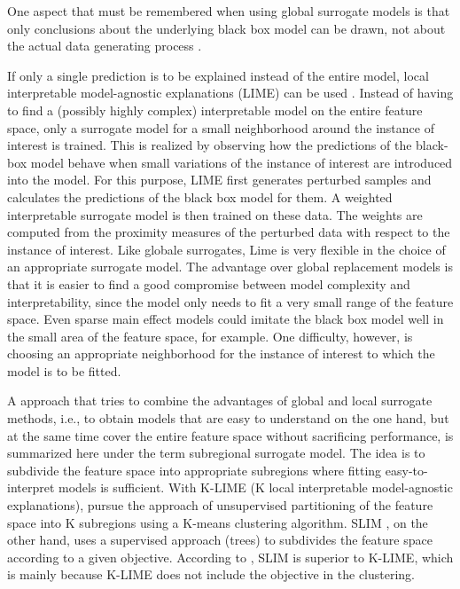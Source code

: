 One aspect that must be remembered when using global surrogate models is that only conclusions about the underlying black box model can be drawn, not about the actual data generating process \citep{Molnar.2019}.


If only a single prediction is to be explained instead of the entire model, local interpretable model-agnostic explanations (LIME) can be used \citep{Ribeiro.2016}. Instead of having to find a (possibly highly complex) interpretable model on the entire feature space, only a surrogate model for a small neighborhood around the instance of interest is trained. This is realized by observing how the predictions of the black-box model behave when small variations of the instance of interest are introduced into the model. For this purpose, LIME first generates perturbed samples and calculates the predictions of the black box model for them. A weighted interpretable surrogate model is then trained on these data. The weights are computed from the proximity measures of the perturbed data with respect to the instance of interest. 
Like globale surrogates, Lime is very flexible in the choice of an appropriate surrogate model. The advantage over global replacement models is that it is easier to find a good compromise between model complexity and interpretability, since the model only needs to fit a very small range of the feature space. Even sparse main effect models could imitate the black box model well in the small area of the feature space, for example. One difficulty, however, is choosing an appropriate neighborhood for the instance of interest to which the model is to be fitted.
\citep{Molnar.2019}


A approach that tries to combine the advantages of global and local surrogate methods, i.e., to obtain models that are easy to understand on the one hand, but at the same time cover the entire feature space without sacrificing performance, is summarized here under the term subregional surrogate model.
The idea is to subdivide the feature space into appropriate subregions where fitting easy-to-interpret models is sufficient.
With K-LIME (K local interpretable model-agnostic explanations), \citet{Hall.2017}  pursue the approach of unsupervised partitioning of the feature space into K subregions using a K-means clustering algorithm. 
SLIM \citep{Hu.2020}, on the other hand, uses a supervised approach (trees) to subdivides the feature space according to a given objective. According to \citep{Hu.2018}, SLIM is superior to K-LIME, which is mainly because K-LIME does not include the objective in the clustering.

